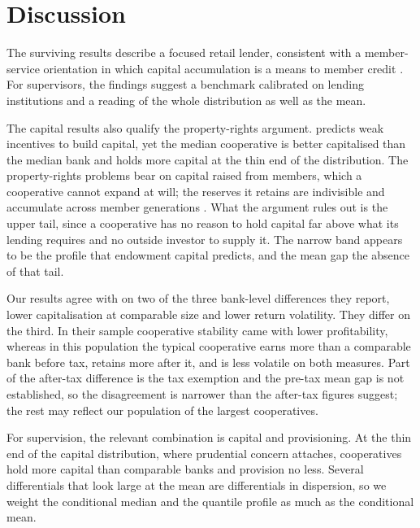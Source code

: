 \documentclass[11pt,a4paper]{article}
\begin{document}
\section{Discussion}

The surviving results describe a focused retail lender, consistent with a
member-service orientation in which capital accumulation is a means to member credit
\citep{fonteyne2007}. For supervisors, the findings suggest a benchmark calibrated on
lending institutions and a reading of the whole distribution as well as the mean.

The capital results also qualify the property-rights argument. \citet{cook1995}
predicts weak incentives to build capital, yet the median cooperative is better
capitalised than the median bank and holds more capital at the thin end of the
distribution. The
property-rights problems bear on capital raised from members, which a cooperative cannot
expand at will; the reserves it retains are indivisible and accumulate across member
generations \citep{fonteyne2007}. What the argument rules out is the upper tail, since a
cooperative has no reason to hold capital far above what its lending requires and no
outside investor to supply it. The narrow band appears to be the profile that endowment
capital predicts, and the mean gap the absence of that tail.

Our results agree with \citet{hesse2007} on two of the three bank-level differences
they report, lower capitalisation at comparable size and lower return volatility. They
differ on the third.
In their sample cooperative stability came with lower profitability, whereas in this
population the typical cooperative earns more than a comparable bank before tax, retains
more after it, and is less volatile on both measures. Part of the after-tax difference
is the tax exemption and the pre-tax mean gap is not established, so the disagreement
is narrower than the after-tax figures suggest; the rest may reflect our population of
the largest cooperatives.

For supervision, the relevant combination is capital and provisioning. At the thin end
of the capital distribution, where prudential concern attaches, cooperatives hold more
capital than comparable banks and provision no less. Several differentials that look
large at the mean are differentials in dispersion, so we weight the conditional median
and the quantile profile as much as the conditional mean.
\end{document}

